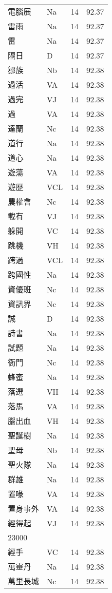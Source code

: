 \documentclass[twocolumn]{book}
\begin{document}
\begin{supertabular}{llrr}
電腦展 & Na & 14 &  92.37\\
雷雨 & Na & 14 &  92.37\\
雷 & Na & 14 &  92.37\\
隔日 & D & 14 &  92.37\\
鄒族 & Nb & 14 &  92.38\\
過活 & VA & 14 &  92.38\\
過完 & VJ & 14 &  92.38\\
過 & VA & 14 &  92.38\\
達蘭 & Nc & 14 &  92.38\\
道行 & Na & 14 &  92.38\\
道心 & Na & 14 &  92.38\\
遊蕩 & VA & 14 &  92.38\\
遊歷 & VCL & 14 &  92.38\\
農權會 & Nc & 14 &  92.38\\
載有 & VJ & 14 &  92.38\\
躲開 & VC & 14 &  92.38\\
跳機 & VH & 14 &  92.38\\
跨過 & VCL & 14 &  92.38\\
跨國性 & Na & 14 &  92.38\\
資優班 & Nc & 14 &  92.38\\
資訊界 & Nc & 14 &  92.38\\
誠 & D & 14 &  92.38\\
詩書 & Na & 14 &  92.38\\
試題 & Na & 14 &  92.38\\
衙門 & Nc & 14 &  92.38\\
蜂蜜 & Na & 14 &  92.38\\
落選 & VH & 14 &  92.38\\
落馬 & VA & 14 &  92.38\\
腦出血 & VH & 14 &  92.38\\
聖誕樹 & Na & 14 &  92.38\\
聖母 & Nb & 14 &  92.38\\
聖火隊 & Na & 14 &  92.38\\
群雄 & Na & 14 &  92.38\\
置喙 & VA & 14 &  92.38\\
置身事外 & VA & 14 &  92.38\\
經得起 & VJ & 14 &  92.38\\
23000\\
經手 & VC & 14 &  92.38\\
萬靈丹 & Na & 14 &  92.38\\
萬里長城 & Nc & 14 &  92.38\\

\end{supertabular}
\end{document}
